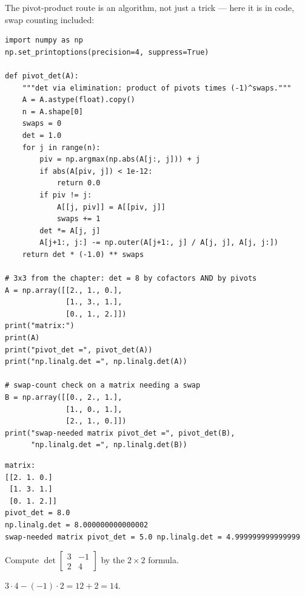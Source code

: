 The pivot-product route is an algorithm, not just a trick --- here it is in
code, swap counting included:

\begin{lstlisting}[caption={\ttfamily code/ch06\_pivot\_det.py --- $\det$ as
signed pivot product, verified against \ttfamily np.linalg.det on the
Example~\ref{ex:det3} matrix and on a matrix that forces a row swap.}]
import numpy as np
np.set_printoptions(precision=4, suppress=True)

def pivot_det(A):
    """det via elimination: product of pivots times (-1)^swaps."""
    A = A.astype(float).copy()
    n = A.shape[0]
    swaps = 0
    det = 1.0
    for j in range(n):
        piv = np.argmax(np.abs(A[j:, j])) + j
        if abs(A[piv, j]) < 1e-12:
            return 0.0
        if piv != j:
            A[[j, piv]] = A[[piv, j]]
            swaps += 1
        det *= A[j, j]
        A[j+1:, j:] -= np.outer(A[j+1:, j] / A[j, j], A[j, j:])
    return det * (-1.0) ** swaps

# 3x3 from the chapter: det = 8 by cofactors AND by pivots
A = np.array([[2., 1., 0.],
              [1., 3., 1.],
              [0., 1., 2.]])
print("matrix:")
print(A)
print("pivot_det =", pivot_det(A))
print("np.linalg.det =", np.linalg.det(A))

# swap-count check on a matrix needing a swap
B = np.array([[0., 2., 1.],
              [1., 0., 1.],
              [2., 1., 0.]])
print("swap-needed matrix pivot_det =", pivot_det(B),
      "np.linalg.det =", np.linalg.det(B))
\end{lstlisting}

\begin{lstlisting}[caption={Output of the pivot determinant. Notice the
swap-counted version matches the library on both --- including the matrix
whose zero top-left forces a swap ($\det=5$).}]
matrix:
[[2. 1. 0.]
 [1. 3. 1.]
 [0. 1. 2.]]
pivot_det = 8.0
np.linalg.det = 8.000000000000002
swap-needed matrix pivot_det = 5.0 np.linalg.det = 4.999999999999999
\end{lstlisting}

\begin{exercise}[easy]\label{ex:det-e1}
Compute $\det\begin{bmatrix}3&-1\\2&4\end{bmatrix}$ by the $2\times2$
formula.
\begin{solution}
$3\cdot4-(-1)\cdot2=12+2=14$.
\end{solution}
\end{exercise}


